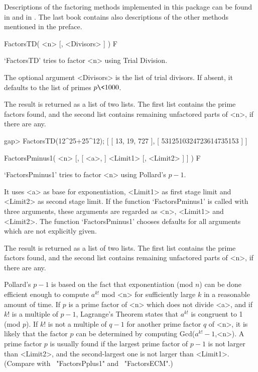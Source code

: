 

Descriptions of the factoring methods implemented in this package can
be found in \cite{Bressoud89} and in \cite{Cohen93}.
The last book contains also descriptions of the other methods mentioned
in the preface.


\>FactorsTD( <n> [, <Divisors> ] ) F

`FactorsTD' tries to factor <n> using Trial Division.

The optional argument <Divisors> is the list of trial divisors.
If absent, it defaults to the list of primes $p \< 1000$.

The result is returned as a list of two lists. The first list
contains the prime factors found, and the second list contains
remaining unfactored parts of <n>, if there are any.

\beginexample
gap> FactorsTD(12^25+25^12);
[ [ 13, 19, 727 ], [ 5312510324723614735153 ] ]
\endexample


\>FactorsPminus1( <n> [, [ <a>, ] <Limit1> [, <Limit2> ] ] ) F

`FactorsPminus1' tries to factor <n> using Pollard's $p-1$.

It uses <a> as base for exponentiation, <Limit1> as first stage limit
and <Limit2> as second stage limit.
If the function `FactorsPminus1' is called with three arguments,
these arguments are regarded as <n>, <Limit1> and <Limit2>.
The function `FactorsPminus1' chooses defaults for all arguments
which are not explicitly given.

The result is returned as a list of two lists. The first list
contains the prime factors found, and the second list contains
remaining unfactored parts of <n>, if there are any.

Pollard's $p-1$ is based on the fact that exponentiation (mod $n$)
can be done efficient enough to compute $a^{k!}$ mod <n> for
sufficiently large $k$ in a reasonable amount of time.
If $p$ is a prime factor of <n> which does not divide <a>,
and if $k!$ is a multiple of $p-1$,
Lagrange's Theorem states that $a^{k!}$ is congruent to 1 (mod $p$).
If $k!$ is not a multiple of $q-1$ for another prime factor $q$ of <n>,
it is likely that the factor $p$ can be determined by computing
Gcd($a^{k!}-1$,<n>).
A prime factor $p$ is usually found if the largest prime factor
of $p-1$ is not larger than <Limit2>, and the second-largest one
is not larger than <Limit1>.
(Compare with ~"FactorsPplus1" and ~"FactorsECM".)


